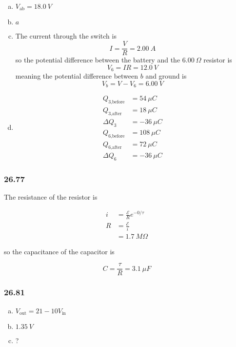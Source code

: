 \documentclass{article}
\begin{document}
\begin{enumerate}[(a)]
  \item $V_\textrm{ab} = \qty{18.0}{V}$

  \item $a$

  \item The current through the switch is \[I = \frac{V}{R} = \qty{2.00}{A}\] so the potential difference between the battery and the $\qty{6.00}{\Omega}$ resistor is \[V_6 = I R = \qty{12.0}{V}\] meaning the potential difference between $b$ and ground is \[V_b = V - V_6 = \qty{6.00}{V}\]

  \item

        \begin{align*}
          Q_{3\textrm{,before}} & = \qty{54}{\mu C}  \\
          Q_{3\textrm{,after}}  & = \qty{18}{\mu C}  \\
          \Delta Q_3            & = \qty{-36}{\mu C} \\
          Q_{6\textrm{,before}} & = \qty{108}{\mu C} \\
          Q_{6\textrm{,after}}  & = \qty{72}{\mu C}  \\
          \Delta Q_6            & = \qty{-36}{\mu C}
        \end{align*}
\end{enumerate}

\subsubsection{26.77}

The resistance of the resistor is

\begin{align*}
  i & = \frac{\mathcal{E}}{R} e^{-0 / \tau} \\
  R & = \frac{\mathcal{E}}{i}               \\
    & = \qty{1.7}{M \Omega}
\end{align*}

so the capacitance of the capacitor is

\[C = \frac{\tau}{R} = \qty{3.1}{\mu F}\]

\subsubsection{26.81}

\begin{enumerate}[(a)]
  \item $V_\textrm{out} = 21 - 10 V_\textrm{in}$

  \item $\qty{1.35}{V}$

  \item ?
\end{enumerate}
\end{document}
